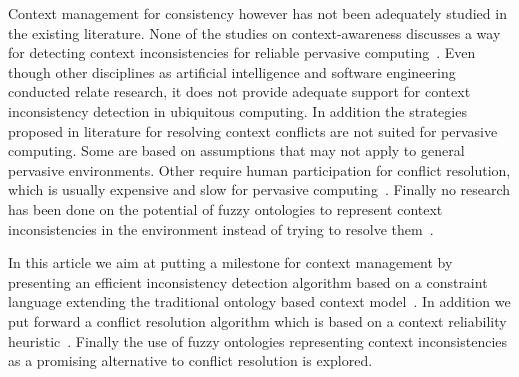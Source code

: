 \documentclass[journal]{vgtc}                %
\begin{document}
Context management for consistency however has not been adequately studied in the existing literature. None of the studies on context-awareness discusses a way for detecting context inconsistencies for reliable pervasive computing~\cite{xu:2010:PCC, bu:2006:CCM}. Even though other disciplines as artificial intelligence and software engineering conducted relate research, it does not provide adequate support for context inconsistency detection in ubiquitous computing. In addition the strategies proposed in literature for resolving context conflicts are not suited for pervasive computing. Some are based on assumptions that may not apply to general pervasive environments. Other require human participation for conflict resolution, which is usually expensive and slow for pervasive computing~\cite{xu:2010:PCC}. Finally no research has been done on the potential of fuzzy ontologies to represent context inconsistencies in the environment instead of trying to resolve them~\cite{ko:2009:IOFO}.

In this article we aim at putting a milestone for context management by presenting an efficient inconsistency detection algorithm based on a constraint language extending the traditional ontology based context model~\cite{xu:2010:PCC}. In addition we put forward a conflict resolution algorithm which is based on a context reliability heuristic~\cite{bu:2006:CCM}. Finally the use of fuzzy ontologies representing context inconsistencies as a promising alternative to conflict resolution is explored.
\end{document}

